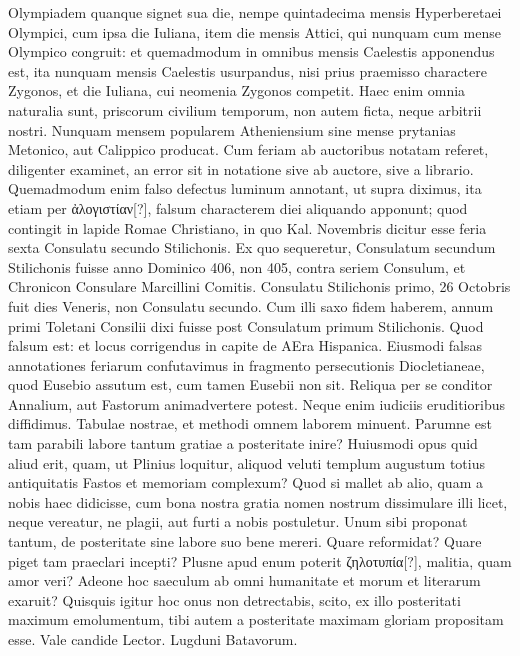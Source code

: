Olympiadem quanque signet sua die,
nempe quintadecima mensis Hyperberetaei Olympici, cum ipsa die
Iuliana, item die mensis Attici, qui nunquam cum mense Olympico
congruit: et quemadmodum in omnibus mensis Caelestis apponendus
est, ita nunquam mensis Caelestis usurpandus, nisi prius praemisso charactere
Zygonos, et die Iuliana, cui neomenia Zygonos competit.
Haec enim omnia naturalia sunt, priscorum civilium temporum, non
autem ficta, neque arbitrii nostri.
Nunquam mensem popularem Atheniensium
sine mense prytanias Metonico, aut Calippico producat.
Cum feriam ab auctoribus notatam referet, diligenter examinet, an
error sit in notatione sive ab auctore, sive a librario.
Quemadmodum
enim falso defectus luminum annotant, ut supra diximus, ita etiam
per \textgreek{ἀλογιστίαν[?]}, falsum characterem diei aliquando apponunt;
 quod contingit
in lapide Romae Christiano, in quo  Kal. Novembris dicitur
esse feria sexta Consulatu secundo Stilichonis.
Ex quo sequeretur, Consulatum
secundum Stilichonis fuisse anno Dominico 406, non 405,
contra seriem Consulum, et Chronicon Consulare Marcillini Comitis.
Consulatu Stilichonis primo, 26 Octobris fuit dies Veneris,
non Consulatu secundo.
Cum illi saxo fidem haberem, annum primi
Toletani Consilii dixi fuisse post Consulatum primum Stilichonis.
Quod falsum est: et locus corrigendus in capite de AEra Hispanica.
Eiusmodi falsas annotationes feriarum confutavimus in fragmento
persecutionis Diocletianeae, quod Eusebio assutum est, cum tamen
Eusebii non sit.
Reliqua per se conditor Annalium, aut Fastorum animadvertere
potest.
Neque enim iudiciis eruditioribus diffidimus.
Tabulae nostrae, et methodi omnem laborem minuent.
Parumne est
tam parabili labore tantum gratiae a posteritate inire?
Huiusmodi
opus quid aliud erit, quam, ut Plinius loquitur, aliquod veluti templum
augustum totius antiquitatis Fastos et memoriam complexum?
Quod si mallet ab alio, quam a nobis haec didicisse, cum bona nostra
gratia nomen nostrum dissimulare illi licet, neque vereatur, ne
plagii, aut furti a nobis postuletur.
Unum sibi proponat tantum, de
posteritate sine labore suo bene mereri.
Quare reformidat?
Quare piget tam praeclari incepti?
Plusne apud enum poterit \textgreek{ζηλοτυπία[?]}, malitia,
quam amor veri?
Adeone hoc saeculum ab omni humanitate et
morum et literarum exaruit?
Quisquis igitur hoc onus non detrectabis,
scito, ex illo posteritati maximum emolumentum, tibi autem
a posteritate maximam gloriam propositam esse.
Vale candide
Lector.
Lugduni Batavorum.
%
